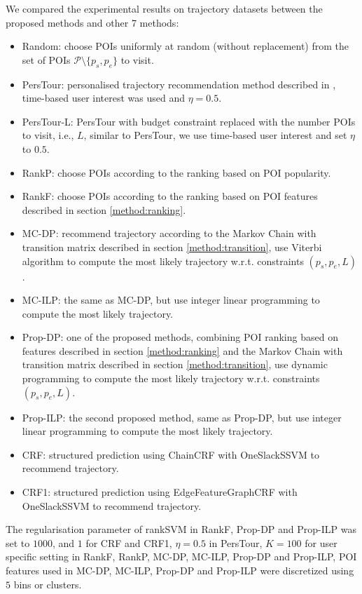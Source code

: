 We compared the experimental results on trajectory datasets between the proposed methods and other 7 methods:
\begin{itemize}
\item Random: choose POIs uniformly at random (without replacement) from the set of POIs $\mathcal{P} \setminus \{p_s, p_e \}$ to visit.
\item PersTour\cite{ijcai15}: personalised trajectory recommendation method described in \cite{ijcai15}, 
      time-based user interest was used and $\eta = 0.5$.
\item PersTour-L: PersTour\cite{ijcai15} with budget constraint replaced with the number POIs to visit, i.e., $L$,
      similar to PersTour, we use time-based user interest and set $\eta$ to $0.5$.
\item RankP: choose POIs according to the ranking based on POI popularity.
\item RankF: choose POIs according to the ranking based on POI features described in section \ref{method:ranking}.
\item MC-DP: recommend trajectory according to the Markov Chain with transition matrix described in section \ref{method:transition},
      use Viterbi algorithm to compute the most likely trajectory w.r.t. constraints $(p_s, p_e, L)$.
\item MC-ILP: the same as MC-DP, but use integer linear programming to compute the most likely trajectory.
\item Prop-DP: one of the proposed methods, combining POI ranking based on features 
      described in section \ref{method:ranking} and the Markov Chain with transition matrix described in section \ref{method:transition},
      use dynamic programming to compute the most likely trajectory w.r.t. constraints $(p_s, p_e, L)$.
\item Prop-ILP: the second proposed method, same as Prop-DP,
      but use integer linear programming to compute the most likely trajectory.
\item CRF: structured prediction using ChainCRF with OneSlackSSVM to recommend trajectory.
\item CRF1: structured prediction using EdgeFeatureGraphCRF with OneSlackSSVM to recommend trajectory.
\end{itemize}

The regularisation parameter of rankSVM in RankF, Prop-DP and Prop-ILP was set to $1000$, and $1$ for CRF and CRF1,
$\eta=0.5$ in PersTour,
$K=100$ for user specific setting in RankF, RankP, MC-DP, MC-ILP, Prop-DP and Prop-ILP,
POI features used in MC-DP, MC-ILP, Prop-DP and Prop-ILP were discretized using $5$ bins or clusters.


